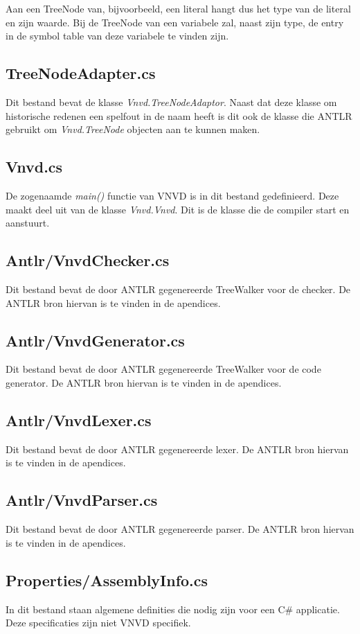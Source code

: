 Aan een TreeNode van, bijvoorbeeld, een literal hangt dus het type van de literal en zijn waarde. Bij de TreeNode van een variabele zal, naast zijn type, de entry in de symbol table van deze variabele te vinden zijn.

\subsection{TreeNodeAdapter.cs}
Dit bestand bevat de klasse \textit{Vnvd.TreeNodeAdaptor}. Naast dat deze klasse om historische redenen een spelfout in de naam heeft is dit ook de klasse die ANTLR gebruikt om \textit{Vnvd.TreeNode} objecten aan te kunnen maken.

\subsection{Vnvd.cs}
De zogenaamde \textit{main()} functie van VNVD is in dit bestand gedefinieerd. Deze maakt deel uit van de klasse \textit{Vnvd.Vnvd}. Dit is de klasse die de compiler start en aanstuurt.

\subsection{Antlr/VnvdChecker.cs}
Dit bestand bevat de door ANTLR gegenereerde TreeWalker voor de checker. De ANTLR bron hiervan is te vinden in de apendices.

\subsection{Antlr/VnvdGenerator.cs}
Dit bestand bevat de door ANTLR gegenereerde TreeWalker voor de code generator. De ANTLR bron hiervan is te vinden in de apendices.

\subsection{Antlr/VnvdLexer.cs}
Dit bestand bevat de door ANTLR gegenereerde lexer. De ANTLR bron hiervan is te vinden in de apendices.

\subsection{Antlr/VnvdParser.cs}
Dit bestand bevat de door ANTLR gegenereerde parser. De ANTLR bron hiervan is te vinden in de apendices.

\subsection{Properties/AssemblyInfo.cs}
In dit bestand staan algemene definities die nodig zijn voor een C\# applicatie. Deze specificaties zijn niet VNVD specifiek.

